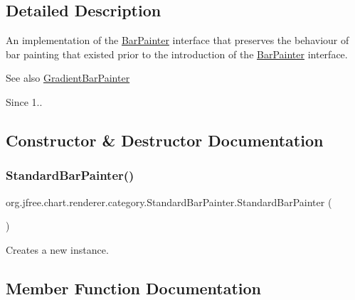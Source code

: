 \subsection{Detailed Description}
An implementation of the \mbox{\hyperlink{interfaceorg_1_1jfree_1_1chart_1_1renderer_1_1category_1_1_bar_painter}{Bar\+Painter}} interface that preserves the behaviour of bar painting that existed prior to the introduction of the \mbox{\hyperlink{interfaceorg_1_1jfree_1_1chart_1_1renderer_1_1category_1_1_bar_painter}{Bar\+Painter}} interface.

\begin{DoxySeeAlso}{See also}
\mbox{\hyperlink{classorg_1_1jfree_1_1chart_1_1renderer_1_1category_1_1_gradient_bar_painter}{Gradient\+Bar\+Painter}}
\end{DoxySeeAlso}
\begin{DoxySince}{Since}
1.. 
\end{DoxySince}


\subsection{Constructor \& Destructor Documentation}
\mbox{\label{classorg_1_1jfree_1_1chart_1_1renderer_1_1category_1_1_standard_bar_painter_ab06adb03a5ffe9d33029d1a23fc8aa24}} 
\subsubsection{\texorpdfstring{Standard\+Bar\+Painter()}{StandardBarPainter()}}
{\footnotesize\ttfamily org.\+jfree.\+chart.\+renderer.\+category.\+Standard\+Bar\+Painter.\+Standard\+Bar\+Painter (\begin{DoxyParamCaption}{ }\end{DoxyParamCaption})}

Creates a new instance. 

\subsection{Member Function Documentation}
\mbox{\label{classorg_1_1jfree_1_1chart_1_1renderer_1_1category_1_1_standard_bar_painter_a7818bf9f210678b48b1c9b64b3323cd2}} 
